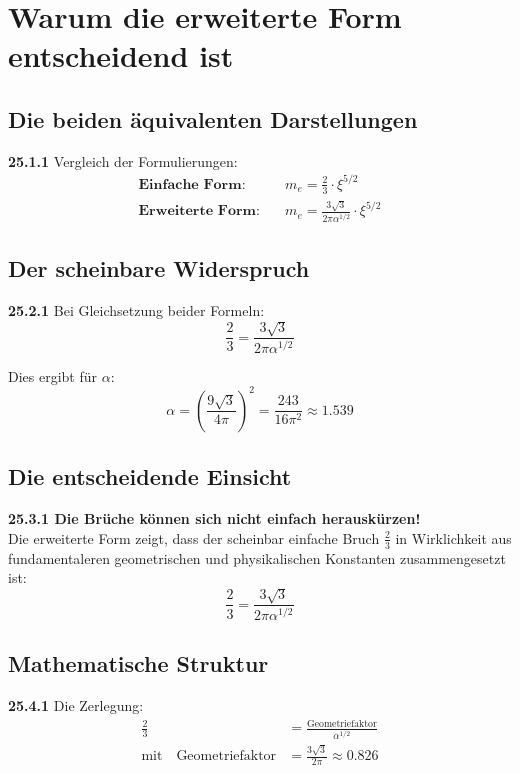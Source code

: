 \section{Warum die erweiterte Form entscheidend ist}

\subsection{Die beiden äquivalenten Darstellungen}

\noindent \textbf{25.1.1} Vergleich der Formulierungen:
\begin{align*}
	\textbf{Einfache Form:} &\quad m_e = \frac{2}{3} \cdot \xi^{5/2} \\
	\textbf{Erweiterte Form:} &\quad m_e = \frac{3\sqrt{3}}{2\pi\alpha^{1/2}} \cdot \xi^{5/2}
\end{align*}

\subsection{Der scheinbare Widerspruch}

\noindent \textbf{25.2.1} Bei Gleichsetzung beider Formeln:
\[
\frac{2}{3} = \frac{3\sqrt{3}}{2\pi\alpha^{1/2}}
\]

Dies ergibt für $\alpha$:
\[
\alpha = \left(\frac{9\sqrt{3}}{4\pi}\right)^2 = \frac{243}{16\pi^2} \approx 1.539
\]

\subsection{Die entscheidende Einsicht}

\begin{tcolorbox}[colback=red!5!white,colframe=red!75!black]
	\textbf{25.3.1 Die Brüche können sich nicht einfach herauskürzen!}
	\\
	Die erweiterte Form zeigt, dass der scheinbar einfache Bruch $\frac{2}{3}$ in Wirklichkeit aus fundamentaleren geometrischen und physikalischen Konstanten zusammengesetzt ist:
	\[
	\frac{2}{3} = \frac{3\sqrt{3}}{2\pi\alpha^{1/2}}
	\]
\end{tcolorbox}

\subsection{Mathematische Struktur}

\noindent \textbf{25.4.1} Die Zerlegung:
\begin{align*}
	\frac{2}{3} &= \frac{\text{Geometriefaktor}}{\alpha^{1/2}} \\
	\text{mit} \quad \text{Geometriefaktor} &= \frac{3\sqrt{3}}{2\pi} \approx 0.826
\end{align*}

